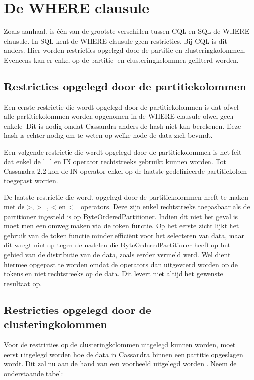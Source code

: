 \section{De WHERE clausule}
Zoals \cite{Lerer2015Where} aanhaalt is één van de grootste verschillen tussen CQL en SQL de WHERE clausule.
In SQL kent de WHERE clausule geen restricties.
Bij CQL is dit anders.
Hier worden restricties opgelegd door de partitie en clusteringkolommen.
Eveneens kan er enkel op de partitie- en clusteringkolommen gefilterd worden.

\subsection{Restricties opgelegd door de partitiekolommen}

Een eerste restrictie die wordt opgelegd door de partitiekolommen is dat ofwel alle partitiekolommen worden opgenomen in de WHERE clausule ofwel geen enkele.
Dit is nodig omdat Cassandra anders de hash niet kan berekenen.
Deze hash is echter nodig om te weten op welke node de data zich bevindt.

Een volgende restrictie die wordt opgelegd door de partitiekolommen is het feit dat enkel de '=' en IN operator rechtstreeks gebruikt kunnen worden.
Tot Cassandra 2.2 kon de IN operator enkel op de laatste gedefinieerde partitiekolom toegepast worden.

De laatste restrictie die wordt opgelegd door de partitiekolommen heeft te maken met de >, >=, < en <= operators.
Deze zijn enkel rechtstreeks toepasbaar als de partitioner ingesteld is op ByteOrderedPartitioner.
Indien dit niet het geval is moet men een omweg maken via de token functie.
Op het eerste zicht lijkt het gebruik van de token functie minder efficiënt voor het selecteren van data, maar dit weegt niet op tegen de nadelen die ByteOrderedPartitioner heeft op het gebied van de distributie van de data, zoals eerder vermeld werd.
Wel dient hiermee opgepast te worden omdat de operators dan uitgevoerd worden op de tokens en niet rechtstreeks op de data.
Dit levert niet altijd het gewenste resultaat op.

\subsection{Restricties opgelegd door de clusteringkolommen}
Voor de restricties op de clusteringkolommen uitgelegd kunnen worden, moet eerst uitgelegd worden hoe de data in Cassandra binnen een partitie opgeslagen wordt.
Dit zal nu aan de hand van een voorbeeld uitgelegd worden \citep{Lerer2015Where}.
Neem de onderstaande tabel:

